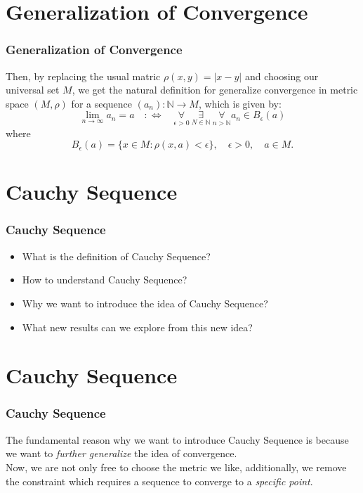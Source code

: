\documentclass[12pt, t]{beamer}
\renewcommand{\emph}[1]{{\color{Turquoise3}\textsl{#1}}}
\begin{document}
\section{Generalization of Convergence}
\begin{frame}
    \frametitle{Generalization of Convergence}
Then, by replacing the usual matric $\rho(x,y)=|x-y|$ and choosing our universal set $M$, we get the natural definition for
generalize convergence in metric space $(M,\rho)$ for a sequence $(a_n):\mathbb{N}\rightarrow M$, which is given by:
\begin{equation*}
    \lim_{n\rightarrow \infty}a_n=a\quad :\Leftrightarrow \quad \underset{\epsilon>0}{\forall}\ \underset{N\in \mathbb{N}}{\exists}\ \underset{n>\mathbb{N}}{\forall} a_n\in B_\epsilon(a)
\end{equation*}
where
\begin{equation*}
    B_\epsilon(a)=\{ x\in M:\rho(x,a)<\epsilon\},\quad \epsilon>0,\quad a\in M.
\end{equation*}

\end{frame}

\section{Cauchy Sequence}
\begin{frame}
    \frametitle{Cauchy Sequence}
\begin{itemize}
    \item What is the definition of Cauchy Sequence?
    \item How to understand Cauchy Sequence?
    \item Why we want to introduce the idea of Cauchy Sequence?
    \item What new results can we explore from this new idea?
\end{itemize}

\end{frame}

\section{Cauchy Sequence}
\begin{frame}
    \frametitle{Cauchy Sequence}
The fundamental reason why we want to introduce Cauchy Sequence is because we want to \emph{further generalize} the idea of 
convergence.\\
\vspace{0.5em}
Now, we are not only free to choose the metric we like, additionally, we remove the constraint which requires a sequence 
to converge to a \emph{specific point}.

\end{frame}
\end{document}

